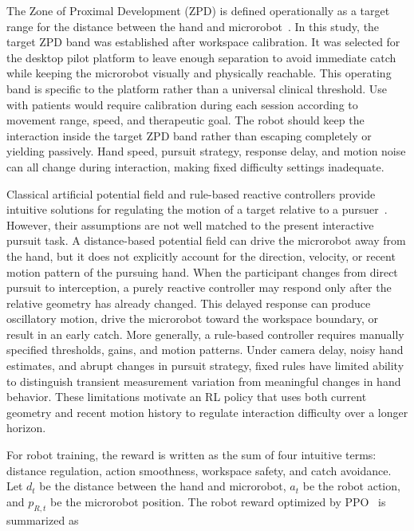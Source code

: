 \documentclass[journal,twoside,web]{ieeecolor2}
\begin{document}
The Zone of Proximal Development (ZPD) is defined operationally as a target range for the distance between the hand and microrobot~\cite{b21,b22}. In this study, the target ZPD band was established after workspace calibration. It was selected for the desktop pilot platform to leave enough separation to avoid immediate catch while keeping the microrobot visually and physically reachable. This operating band is specific to the platform rather than a universal clinical threshold. Use with patients would require calibration during each session according to movement range, speed, and therapeutic goal. The robot should keep the interaction inside the target ZPD band rather than escaping completely or yielding passively. Hand speed, pursuit strategy, response delay, and motion noise can all change during interaction, making fixed difficulty settings inadequate.

Classical artificial potential field and rule-based reactive controllers provide intuitive solutions for regulating the motion of a target relative to a pursuer~\cite{b33,b34}. However, their assumptions are not well matched to the present interactive pursuit task. A distance-based potential field can drive the microrobot away from the hand, but it does not explicitly account for the direction, velocity, or recent motion pattern of the pursuing hand. When the participant changes from direct pursuit to interception, a purely reactive controller may respond only after the relative geometry has already changed. This delayed response can produce oscillatory motion, drive the microrobot toward the workspace boundary, or result in an early catch. More generally, a rule-based controller requires manually specified thresholds, gains, and motion patterns. Under camera delay, noisy hand estimates, and abrupt changes in pursuit strategy, fixed rules have limited ability to distinguish transient measurement variation from meaningful changes in hand behavior. These limitations motivate an RL policy that uses both current geometry and recent motion history to regulate interaction difficulty over a longer horizon.

For robot training, the reward is written as the sum of four intuitive terms: distance regulation, action smoothness, workspace safety, and catch avoidance. Let $d_t$ be the distance between the hand and microrobot, $a_t$ be the robot action, and $p_{R,t}$ be the microrobot position. The robot reward optimized by PPO~\cite{b28} is summarized as
\end{document}
